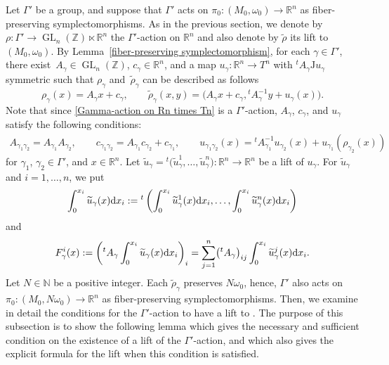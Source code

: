 \documentclass[pdftex]{sigma}
\numberwithin{equation}{section}
\newcommand{\R}{\mathbb{R}}
\newcommand{\Z}{\mathbb{Z}}
\newcommand{\N}{\mathbb{N}}
\renewcommand{\tilde}{\widetilde}
\def\GL{\operatorname{GL}}
\def\J{\mathrm{J}}
\begin{document}
Let $\Gamma'$ be a group,
and suppose that $\Gamma'$ acts on $\pi_0\colon (M_0,\omega_0)\to \R^n$ as fiber-preserving symplectomorphisms. As in the previous section, we denote by $\rho\colon \Gamma' \to \GL_n(\Z)\ltimes \R^n$ the $\Gamma'$-action on $\R^n$ and also denote by $\tilde \rho$ its lift to $(M_0,\omega_0)$.
By Lemma~\ref{fiber-preserving symplectomorphism}, for each $\gamma\in \Gamma'$, there exist~${A_\gamma \in\GL_n(\Z)}$, $c_\gamma\in \R^n$, and a map $u_\gamma\colon \R^n\to T^n$ with ${}^tA_\gamma \J u_\gamma$ symmetric such that $\rho_\gamma$ and~$\tilde \rho_\gamma$ can be described as follows
\begin{equation}\label{Gamma-action on Rn times Tn}
\rho_\gamma (x)=A_\gamma x+c_\gamma ,\qquad {\tilde \rho}_\gamma (x,y)=\bigl(A_\gamma x+c_\gamma ,{}^tA_\gamma^{-1}y+u_\gamma (x)\bigr) .
\end{equation}
Note that since \eqref{Gamma-action on Rn times Tn} is a $\Gamma'$-action, $A_\gamma$, $c_\gamma$, and $u_\gamma$ satisfy the following conditions:
\begin{gather}
A_{\gamma_1\gamma_2}=A_{\gamma_1}A_{\gamma_2},\qquad
c_{\gamma_1\gamma_2}=A_{\gamma_1}c_{\gamma_2}+c_{\gamma_1},\qquad
u_{\gamma_1\gamma_2}(x)={}^tA_{\gamma_1}^{-1}u_{\gamma_2}(x)+u_{\gamma_1}(\rho_{\gamma_2}(x))\label{condition for action}
\end{gather}
for $\gamma_1$, $\gamma_2\in \Gamma'$, and $x\in \R^n$.
Let ${\tilde u}_\gamma={}^t\bigl({\tilde u}_\gamma^1,\ldots ,{\tilde u}_\gamma^n\bigr)\colon \R^n\to \R^n$ be a lift of $u_\gamma$. For ${\tilde u}_\gamma$ and $i=1,\ldots ,n$, we put
\[
\int_0^{x_i}{\tilde u}_\gamma (x){\rm d}x_i:=
{}^t\left(\int_0^{x_i}{\tilde u}_\gamma^1 (x){\rm d}x_i, \ldots , \int_0^{x_i}{\tilde u}_\gamma^n (x){\rm d}x_i\right)
\]
and
\[
F_\gamma^i(x):=\left({}^tA_\gamma \int_0^{x_i}{\tilde u}_\gamma (x){\rm d}x_i\right)_i=\sum_{j=1}^n\bigl({}^tA_\gamma\bigr)_{ij}\int_0^{x_i}{\tilde u}_\gamma^j (x){\rm d}x_i.
\]
Let $N\in \N$ be a positive integer. Each $\tilde \rho_\gamma$ preserves $N\omega_0$, hence, $\Gamma'$ also acts on $\pi_0\colon (M_0,N\omega_0)\to \R^n$ as fiber-preserving symplectomorphisms. Then, we examine in detail the conditions for the $\Gamma'$-action to have a lift to . The purpose of this subsection is to show the following lemma which gives the necessary and sufficient condition on the existence of a lift of the $\Gamma'$-action, and which also gives the explicit formula for the lift when this condition is satisfied.
\end{document}
